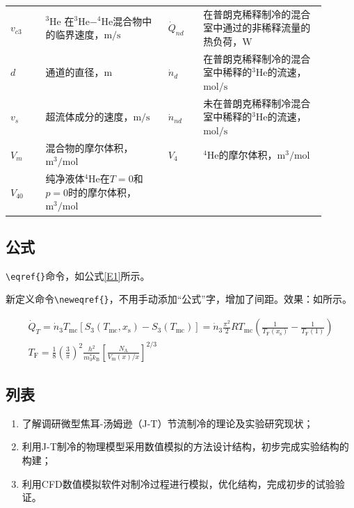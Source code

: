 \begin{table}[H]
\begin{tabular}{m{0.1\linewidth}m{0.35\linewidth}m{0.1\linewidth}m{0.35\linewidth}}
		$v_{c3}$ & $\mathrm{^3He}$ 在$\mathrm{^3He-^4He}$混合物中的临界速度，$\mathrm{m/s}$ & $\dot{Q}_{nd}$ & 在普朗克稀释制冷的混合室中通过的非稀释流量的热负荷，$\mathrm{W}$ \\
		$d$ & 通道的直径，$\mathrm{m}$ & $\dot{n}_d$ & 在普朗克稀释制冷的混合室中稀释的$\mathrm{^3He}$的流速，$\mathrm{mol/s}$ \\
		$v_s$ & 超流体成分的速度，$\mathrm{m/s}$ & $\dot{n}_{nd}$ & 未在普朗克稀释制冷混合室中稀释的$\mathrm{^3He}$的流速，$\mathrm{mol/s}$ \\ 
		$V_m$ & 混合物的摩尔体积，$\mathrm{m^3/mol}$ & $V_4$ & $\mathrm{^4He}$的摩尔体积，$\mathrm{m^3/mol}$ \\
		$V_{40}$ & 纯净液体$\mathrm{^4He}$在$T=0$和$p=0$时的摩尔体积，$\mathrm{m^3/mol}$ & & \\
		\bottomrule
	\end{tabular}	
\end{table}


\subsection{公式}

\verb*|\eqref{}|命令，如公式\eqref{E1}所示。

新定义命令\verb*|\neweqref{}|，不用手动添加“公式”字，增加了间距。效果：如所示。

\begin{gather}
	\dot{Q}_{T}=\dot{n}_{3} T_{\mathrm{mc}}\left[S_{3}\left(T_{\mathrm{mc}}, x_{\mathrm{s}}\right)-S_{3}\left(T_{\mathrm{mc}}\right)\right]=\dot{n}_{3} \frac{\pi^{2}}{2} R T_{\mathrm{mc}}\left(\frac{1}{T_{\mathrm{F}}\left(x_{\mathrm{s}}\right)}-\frac{1}{T_{\mathrm{F}}(1)}\right) \label{2E1} \\
	T_{\mathrm{F}}=\frac{1}{8}\left(\frac{3}{\pi}\right)^{2} \frac{h^{2}}{m_{3}^{*} k_{\mathrm{B}}}\left[\frac{N_{\mathrm{A}}}{V_{\mathrm{m}}(x) / x}\right]^{2 / 3} \label{E1}
\end{gather}

\subsection{列表}

\begin{enumerate}[label=(\arabic*)]
	\item 了解调研微型焦耳-汤姆逊（J-T）节流制冷的理论及实验研究现状；
	\item 利用J-T制冷的物理模型采用数值模拟的方法设计结构，初步完成实验结构的构建；
	\item 利用CFD数值模拟软件对制冷过程进行模拟，优化结构，完成初步的试验验证。
\end{enumerate}

